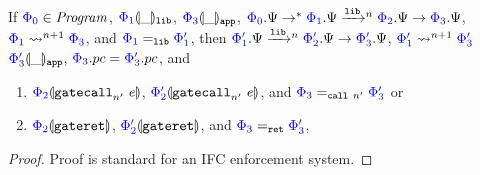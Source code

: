 \begin{theorem} \label{thm:appendix:overlay-confidentiality-soundness}
  If ${\color{blue}{\Phi_0}} \in \mathit{Program}$, ${{\color{blue}{\Phi_1}}}\llparenthesis{\_}\rrparenthesis_{\mathtt{lib}}$,
  ${{\color{blue}{\Phi_3}}}\llparenthesis{\_}\rrparenthesis_{\mathtt{app}}$, $\oc{\Phi_0}.\Psi \stepstar
  \oc{\Phi_1}.\Psi \steplown{n} \oc{\Phi_2}.\Psi \step \oc{\Phi_3}.\Psi$,
  ${\color{blue}{\Phi_1}} \mathrel{\mathrel{\leadsto}^{n + 1}} {\color{blue}{\Phi_3}}$, and ${\color{blue}{\Phi_1}} =_{\mathtt{lib}}
  {\color{blue}{\Phi_1'}}$,
  then $\oc{\Phi_1'}.\Psi \steplown{n} \oc{\Phi_2'}.\Psi \step \oc{\Phi_3'}.\Psi$,
  ${\color{blue}{\Phi_1'}} \mathrel{\mathrel{\leadsto}^{n + 1}} {\color{blue}{\Phi_3'}}$
  ${{\color{blue}{\Phi_3'}}}\llparenthesis{\_}\rrparenthesis_{\mathtt{app}}$, ${\color{blue}{\Phi_3}}.pc = {\color{blue}{\Phi_3'}}.pc$,
  and
  \begin{enumerate}
  \item ${{\color{blue}{\Phi_2}}}\llparenthesis{\ensuremath{\mathtt{gatecall}_{n'}\ {e}}}\rrparenthesis$, ${{\color{blue}{\Phi_2'}}}\llparenthesis{\ensuremath{\mathtt{gatecall}_{n'}\ {e}}}\rrparenthesis$, and ${\color{blue}{\Phi_3}} =_{\mathtt{call}\ n'} {\color{blue}{\Phi_3'}}$ or
  \item ${{\color{blue}{\Phi_2}}}\llparenthesis{\ensuremath{\mathtt{gateret}}}\rrparenthesis$, ${{\color{blue}{\Phi_2'}}}\llparenthesis{\ensuremath{\mathtt{gateret}}}\rrparenthesis$, and ${\color{blue}{\Phi_3}} =_{\mathtt{ret}} {\color{blue}{\Phi_3'}}$,
  \end{enumerate}
\end{theorem}
\begin{proof}
  Proof is standard for an IFC enforcement system.
\end{proof}